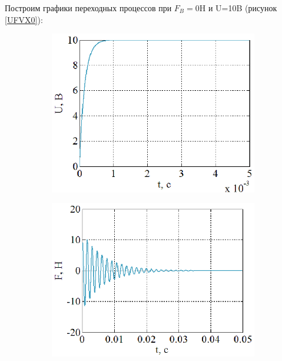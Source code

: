 \documentclass[a4paper,12pt]{article} %
\begin{document}
Построим графики переходных процессов при $F_B=0$H и U=10B (рисунок \ref{UFVX0}):
\begin{figure}[H]
	\centering
	\begin{subfigure}[b]{0.48\textwidth}
	    \includegraphics[width = \textwidth]{scheme/U0}
	\end{subfigure}
	\hfill
	\begin{subfigure}[b]{0.48\textwidth}
		\includegraphics[width = \textwidth]{scheme/F0}
	\end{subfigure}
	\begin{subfigure}[b]{0.48\textwidth}

\end{subfigure}
\end{figure}
\end{document}
